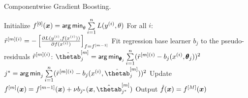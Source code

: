 
\begin{algorithm}[H]
  \begin{footnotesize}
  \begin{center}
  \caption{Componentwise Gradient Boosting.}
    \begin{algorithmic}[1]
      \State Initialize $f^{[0]}(\bm{x}) = \mathop{\sf arg\,min}_{\theta} \sum  \limits_{i=1}^n L(y^{(i)}, \theta)$
        \State For all $i$: $\tilde{r}^{[m](i)} = -\left[\frac{\partial L(y^{(i)}, f(x^{(i)}))}{\partial f(x^{(i)})}\right]_{f=f^{[m-1]}}$
          \State Fit regression base learner $b_j$ to the pseudo-residuals $\tilde{r}^{[m](i)}$:
          \State $\thetamh_j = \argmin_{\pmb\theta_j} \sum  \limits_{i=1}^n 
          (\rmi - b_j(\xi, \pmb\theta_j))^2$
        \EndFor
        \State $j^* = \argmin_{j} \sum  \limits_{i=1}^n (\rmi - b_j(\xi, \thetamh_j))^2$
        \State Update $\fm(\xv) = \fmd(\xv) + \nu b_{j^*}(\xv, \thetamh_{j^{\ast}})$
      \EndFor
      \State Output $\hat{f}(\bm{x}) = f^{[M]}(\bm{x})$
    \end{algorithmic}
    \end{center}
    \end{footnotesize}
\end{algorithm}
